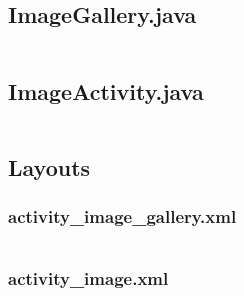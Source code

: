 \documentclass[11pt,english,numbers=endperiod,parskip=half]{scrartcl}
\begin{document}
\subsection{ImageGallery.java}
\inputminted[firstline=41,lastline=83]{java}{../../Apps/ImageIntent/app/src/main/java/au/net/danielparker/imageintent/ImageGallery.java}
\subsection{ImageActivity.java}
\inputminted[firstline=51,lastline=59]{java}{../../Apps/ImageIntent/app/src/main/java/au/net/danielparker/imageintent/ImageActivity.java}

\subsection{Layouts}
\subsubsection{activity\_image\_gallery.xml}
\inputminted{xml}{../../Apps/ImageIntent/app/src/main/res/layout/activity_image_gallery.xml}

\subsubsection{activity\_image.xml}
\inputminted{xml}{../../Apps/ImageIntent/app/src/main/res/layout/activity_image.xml}
\end{document}
